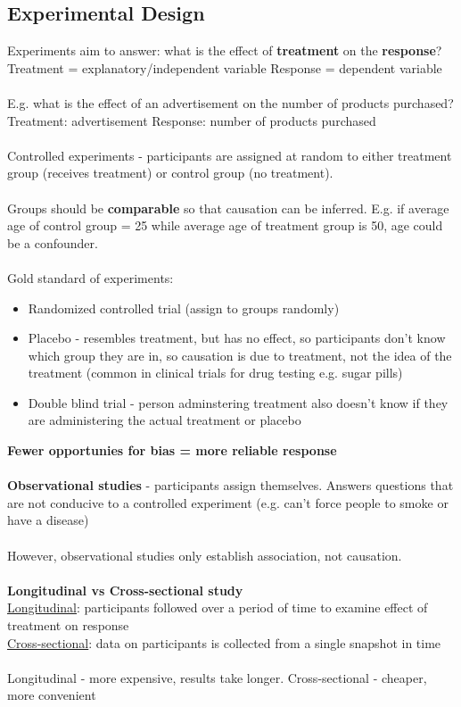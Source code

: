 \documentclass[11pt]{article}
\begin{document}
\subsection{Experimental Design}
Experiments aim to answer: what is the effect of \textbf{treatment} on the \textbf{response}?
Treatment = explanatory/independent variable
Response = dependent variable\\\;\\

E.g. what is the effect of an advertisement on the number of products purchased? \\
Treatment: advertisement
Response: number of products purchased \\\;\\
Controlled experiments - participants are assigned at random to either treatment group (receives treatment) or control group (no treatment).\\\;\\
Groups should be \textbf{comparable} so that causation can be inferred. E.g. if average age of control group = 25 while average age of treatment group is 50, age could be a confounder.
\\\;\\
Gold standard of experiments:
\begin{itemize}
\item Randomized controlled trial (assign to groups randomly)
\item Placebo - resembles treatment, but has no effect, so participants don't know which group they are in, so causation is due to treatment, not the idea of the treatment (common in clinical trials for drug testing e.g. sugar pills)
\item Double blind trial - person adminstering treatment also doesn't know if they are administering the actual treatment or placebo 
\end{itemize}
\textbf{Fewer opportunies for bias =  more reliable response}\\\;\\

\textbf{Observational studies} - participants assign themselves. Answers questions that are not conducive to a controlled experiment (e.g. can't force people to smoke or have a disease) \\\;\\
However, observational studies only establish association, not causation.\\\;\\

\textbf{Longitudinal vs Cross-sectional study}\\
\underline{Longitudinal}: participants followed over a period of time to examine effect of treatment on response\\
\underline{Cross-sectional}: data on participants is collected from a single snapshot in time\\\;\\

Longitudinal - more expensive, results take longer. Cross-sectional - cheaper, more convenient
\end{document}
